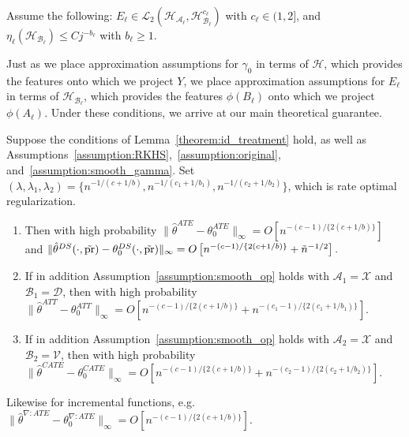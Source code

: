 
\begin{assumption}\label{assumption:smooth_op}
Assume the following: $E_{\ell}\in \mathcal{L}_2(\mathcal{H}_{\mathcal{A}_{\ell}},\mathcal{H}^{c_{\ell}}_{\mathcal{B}_{\ell}})$ with $c_{\ell}\in(1,2]$, and $\eta_{\ell}(\mathcal{H}_{\mathcal{B}_{\ell}})\leq C j^{-b_{\ell}}$ with $b_{\ell}\geq 1$.
\end{assumption}
Just as we place approximation assumptions for $\gamma_0$ in terms of $\mathcal{H}$, which provides the features onto which we project $Y$, we place approximation assumptions for $E_{\ell}$ in terms of $\mathcal{H}_{\mathcal{B}_{\ell}}$, which provides the features $\phi(B_{\ell})$ onto which we project $\phi(A_{\ell})$. Under these conditions, we arrive at our main theoretical guarantee.
\begin{theorem}\label{theorem:consistency_treatment}
Suppose the conditions of Lemma~\ref{theorem:id_treatment} hold, as well as Assumptions~\ref{assumption:RKHS},~\ref{assumption:original}, and~\ref{assumption:smooth_gamma}. Set $(\lambda,\lambda_1,\lambda_2)=\{n^{-1/(c+1/b)},n^{-1/(c_1+1/b_1)},n^{-1/(c_2+1/b_2)}\}$, which is rate optimal regularization.
\begin{enumerate}
    \item Then with high probability
    $
    \|\hat{\theta}^{ATE}-\theta_0^{ATE}\|_{\infty}=O\left[n^{-(c-1)/\{2(c+1/b)\}}\right]$ and $\|\hat{\theta}^{DS}(\cdot,\tilde{\text{\normalfont pr}})-\theta_0^{DS}(\cdot,\tilde{\text{\normalfont pr}})\|_{\infty}=O\left[ n^{-(c-1)/\{2(c+1/b)\}}+\tilde{n}^{-1/2}\right].
    $
    \item If in addition Assumption~\ref{assumption:smooth_op} holds with $\mathcal{A}_1=\mathcal{X}$ and $\mathcal{B}_1=\mathcal{D}$, then with high probability
      $
    \|\hat{\theta}^{ATT}-\theta_0^{ATT}\|_{\infty}=O\left[n^{-(c-1)/\{2(c+1/b)\}}+n^{-(c_1-1)/\{2(c_1+1/b_1)\}}\right].
    $
    \item If in addition Assumption~\ref{assumption:smooth_op} holds with $\mathcal{A}_2=\mathcal{X}$ and $\mathcal{B}_2=\mathcal{V}$, then with high probability
      $
    \|\hat{\theta}^{CATE}-\theta_0^{CATE}\|_{\infty}=O\left[n^{-(c-1)/\{2(c+1/b)\}}+n^{-(c_2-1)/\{2(c_2+1/b_2)\}}\right].
    $
\end{enumerate}
Likewise for incremental functions, e.g. $
    \|\hat{\theta}^{\nabla:ATE}-\theta_0^{\nabla:ATE}\|_{\infty}=O\left[n^{-(c-1)/\{2(c+1/b)\}}\right].
    $
\end{theorem}
